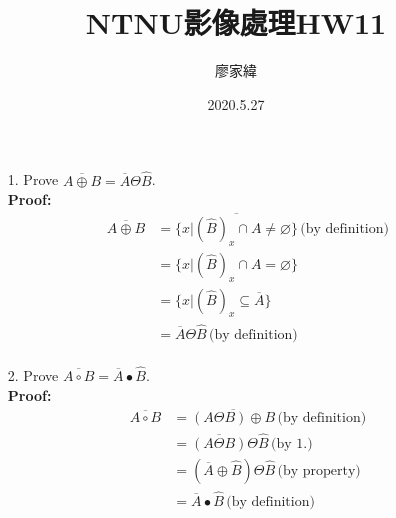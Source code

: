 \documentclass[12pt,a4paper]{article}
\title{NTNU影像處理HW11}
\author{廖家緯}
\date{2020.5.27}
\begin{document}
\maketitle
\fontsize{12pt}{30pt}\selectfont
\setlength{\baselineskip}{25pt}

\pagestyle{fancy}
\lhead{}
\chead{}
\rhead{}
\lfoot{}
\cfoot{\thepage}
\rfoot{}
\renewcommand{\headrulewidth}{0pt} %
\renewcommand{\footrulewidth}{0pt} %




\begin{enumerate}
\item[1.]	
Prove $\overline{A \oplus B}
=\overline{A} \Theta \widehat{B}$.\\
{\bf Proof:}
\begin{align*}
\overline{A \oplus B}
&=\overline{\{x|
(\widehat{B})_x \cap A \neq \varnothing \}}
\,\text{(by definition)}\\
&=\{x|(\widehat{B})_x \cap A=\varnothing \}\\
&=\{x|(\widehat{B})_x \subseteq \overline{A} \}\\
&=\overline{A} \Theta \widehat{B}
\,\text{(by definition)}\\ 
\end{align*}


\item[2.]	
Prove $\overline{A \circ B}
=\overline{A} \bullet \widehat{B}$.\\
{\bf Proof:}
\begin{align*}
\overline{A \circ B}
&=\overline{(A \Theta B) \oplus B}
\,\text{(by definition)}\\ 
&=\overline{(A \Theta B)} \Theta \widehat{B}
\, \text{(by 1.)}\\
&=(\overline{A} \oplus \widehat{B})
\Theta \widehat{B}\, \text{(by property)}\\
&=\overline{A} \bullet \widehat{B}
\,\text{(by definition)}\\ 
\end{align*}


\end{enumerate}
\end{document}
